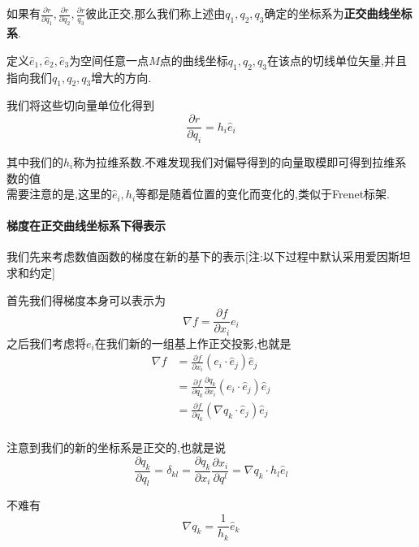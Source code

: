 \documentclass[11pt,hyperref,a4paper,UTF8]{ctexart}
\newcommand{\parameter}[1]{\left(#1\right)}
\begin{document}
\begin{CJK}{UTF8}{gkai}
如果有$\frac{\partial r}{\partial q_1},\frac{\partial r}{\partial q_2},\frac{\partial r}{q_3}$彼此正交,那么我们称上述由$q_1,q_2,q_3$确定的坐标系为\textbf{正交曲线坐标系}.

定义$\hat{e}_1,\hat{e}_2,\hat{e}_3$为空间任意一点$M$点的曲线坐标$q_1,q_2,q_3$在该点的切线单位矢量,并且指向我们$q_1,q_2,q_3$增大的方向.


我们将这些切向量单位化得到
\[\frac{\partial r}{\partial q_i} = h_i \hat{e}_i\]

其中我们的$h_i$称为拉维系数.不难发现我们对偏导得到的向量取模即可得到拉维系数的值\\

需要注意的是,这里的$\hat{e}_i,h_i$等都是随着位置的变化而变化的,类似于Frenet标架.\\

\paragraph{梯度在正交曲线坐标系下得表示\\}
我们先来考虑数值函数的梯度在新的基下的表示[注:以下过程中默认采用爱因斯坦求和约定]

首先我们得梯度本身可以表示为
\[\nabla f = \frac{\partial f}{\partial x_i}e_i \]
之后我们考虑将$e_i$在我们新的一组基上作正交投影,也就是
\[
\begin{aligned}  
\nabla f &= \frac{\partial f}{\partial x_i} (e_i \cdot \hat{e}_j) \hat{e}_j\\
&= \frac{\partial f}{\partial q_k} \frac{\partial q_k}{\partial x_i} (e_i \cdot \hat{e}_j) \hat{e}_j\\
&= \frac{\partial f}{\partial q_k} \parameter{\nabla q_k\cdot \hat{e}_j} \hat{e}_j\\
\end{aligned}
\]

注意到我们的新的坐标系是正交的,也就是说
\[\frac{\partial q_k}{\partial q_l} = \delta_{kl} = \frac{\partial q_k}{\partial x_i} \frac{\partial x_i}{\partial q^l} = \nabla q_k \cdot h_l \hat{e}_l\]

不难有
\[\nabla q_k = \frac{1}{h_k} \hat{e}_k\]


\end{CJK}
\end{document}
